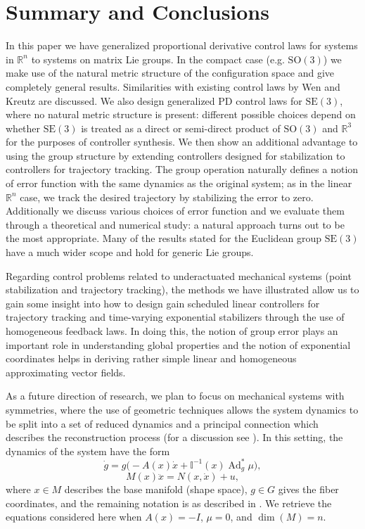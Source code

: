 \documentclass[11pt]{article}
\newcommand{\SO}{\mathrm{SO}}
\newcommand{\SE}{\mathrm{SE}}
\newcommand{\Ad}{\operatorname{Ad}}
\newcommand{\R}{\mathbb R}
\begin{document}
\section{Summary and Conclusions}\label{sec:summary-conclusions}
In this paper we have generalized proportional derivative control laws for systems in $\R^n$ to systems on matrix Lie groups. In the compact case (e.g. $\SO(3)$) we make use of the natural metric structure of the configuration space and give completely general results. Similarities with existing control laws by Wen and Kreutz \cite{34} are discussed. We also design generalized PD control laws for $\SE(3)$, where no natural metric structure is present: different possible choices depend on whether $\SE(3)$ is treated as a direct or semi-direct product of $\SO(3)$ and $\R^3$ for the purposes of controller synthesis. We then show an additional advantage to using the group structure by extending controllers designed for stabilization to controllers for trajectory tracking. The group operation naturally defines a notion of error function with the same dynamics as the original system; as in the linear $\R^n$ case, we track the desired trajectory by stabilizing the error to zero. Additionally we discuss various choices of error function and we evaluate them through a theoretical and numerical study: a natural approach turns out to be the most appropriate. Many of the results stated for the Euclidean group $\SE(3)$ have a much wider scope and hold for generic Lie groups.

Regarding control problems related to underactuated mechanical systems (point stabilization and trajectory tracking), the methods we have illustrated allow us to gain some insight into how to design gain scheduled linear controllers for trajectory tracking and time-varying exponential stabilizers through the use of homogeneous feedback laws. In doing this, the notion of group error plays an important role in understanding global properties and the notion of exponential coordinates helps in deriving rather simple linear and homogeneous approximating vector fields.

As a future direction of research, we plan to focus on mechanical systems with symmetries, where the use of geometric techniques allows the system dynamics to be split into a set of reduced dynamics and a principal connection which describes the reconstruction process (for a discussion see \cite{3}). In this setting, the dynamics of the system have the form
\begin{equation*}
\dot g=g\bigl(-A(x)\dot x+\mathbb I^{-1}(x)\Ad_g^*\mu\bigr),
\end{equation*}
\begin{equation*}
M(x)\ddot x=N(x,\dot x)+u,
\end{equation*}
where $x\in M$ describes the base manifold (shape space), $g\in G$ gives the fiber coordinates, and the remaining notation is as described in \cite{3}. We retrieve the equations considered here when $A(x)=-I$, $\mu=0$, and $\dim(M)=n$.
\end{document}
